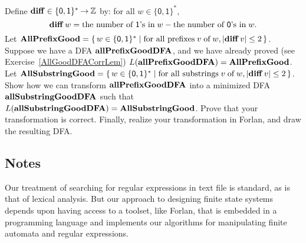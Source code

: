 \begin{exercise}
Define $\mathbf{diff}\in\{\mathsf{0,1}\}^*\mathbin{\to}\mathbb{Z}$ by:
%
%
%
%
for all $w\in\{\mathsf{0,1}\}^*$,
\begin{displaymath}
\mathbf{diff}\,w =
\allowbreak\mbox{the number of $\mathsf{1}$'s in}\allowbreak\;w -
\allowbreak\mbox{the number of $\mathsf{0}$'s in}\allowbreak\;w .
\end{displaymath}
Let
$\mathbf{AllPrefixGood} = \{ \, w\in\{\mathsf{0,1}\}^* \mid \allowbreak\mbox{for all
    prefixes}\allowbreak\; v\;\allowbreak\mbox{of}\allowbreak\;w, |\mathbf{diff}\,v|\leq 2 \, \}$.  Suppose we have a DFA
$\mathbf{allPrefixGoodDFA}$, and we have already proved (see
Exercise~\ref{AllGoodDFACorrLem})
$L(\mathbf{allPrefixGoodDFA}) = \mathbf{AllPrefixGood}$. Let
$\mathbf{AllSubstringGood} = \{ \, w\in\{\mathsf{0,1}\}^* \mid \allowbreak\mbox{for all
    substrings}\allowbreak\; v\;\allowbreak\mbox{of}\allowbreak\;w, |\mathbf{diff}\,v|\leq 2 \, \}$.  Show how we can
transform $\mathbf{allPrefixGoodDFA}$ into a minimized DFA
$\mathbf{allSubstringGoodDFA}$ such that
$L(\mathbf{allSubstringGoodDFA}) = \mathbf{AllSubstringGood}$. Prove that your
transformation is correct. Finally, realize your transformation in
Forlan, and draw the resulting DFA.
\end{exercise}

%

\subsection{Notes}

Our treatment of searching for regular expressions in text file is
standard, as is that of lexical analysis.  But our approach to
designing finite state systems depends upon having access to a
toolset, like Forlan, that is embedded in a programming language and
implements our algorithms for manipulating finite automata and regular
expressions.

%

